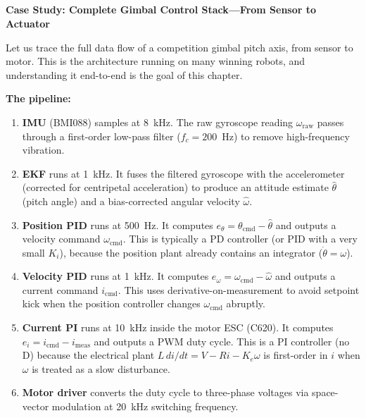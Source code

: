 \subsection*{}

\vspace{0.5em}
\begin{mdframed}[linewidth=1pt, innertopmargin=10pt, innerbottommargin=10pt]
\textbf{Case Study: Complete Gimbal Control Stack---From Sensor to Actuator}

\vspace{0.3em}
Let us trace the full data flow of a competition gimbal pitch axis, from sensor to motor. This is the architecture running on many winning robots, and understanding it end-to-end is the goal of this chapter.

\textbf{The pipeline:}

\begin{enumerate}[nosep]
    \item \textbf{IMU} (BMI088) samples at 8~kHz. The raw gyroscope reading $\omega_{\text{raw}}$ passes through a first-order low-pass filter ($f_c = 200$~Hz) to remove high-frequency vibration.
    \item \textbf{EKF} runs at 1~kHz. It fuses the filtered gyroscope with the accelerometer (corrected for centripetal acceleration) to produce an attitude estimate $\hat{\theta}$ (pitch angle) and a bias-corrected angular velocity $\hat{\omega}$.
    \item \textbf{Position PID} runs at 500~Hz. It computes $e_\theta = \theta_{\text{cmd}} - \hat{\theta}$ and outputs a velocity command $\omega_{\text{cmd}}$. This is typically a PD controller (or PID with a very small $K_i$), because the position plant already contains an integrator ($\dot{\theta} = \omega$).
    \item \textbf{Velocity PID} runs at 1~kHz. It computes $e_\omega = \omega_{\text{cmd}} - \hat{\omega}$ and outputs a current command $i_{\text{cmd}}$. This uses derivative-on-measurement to avoid setpoint kick when the position controller changes $\omega_{\text{cmd}}$ abruptly.
    \item \textbf{Current PI} runs at 10~kHz inside the motor ESC (C620). It computes $e_i = i_{\text{cmd}} - i_{\text{meas}}$ and outputs a PWM duty cycle. This is a PI controller (no D) because the electrical plant $L\,di/dt = V - Ri - K_e\omega$ is first-order in $i$ when $\omega$ is treated as a slow disturbance.
    \item \textbf{Motor driver} converts the duty cycle to three-phase voltages via space-vector modulation at 20~kHz switching frequency.
\end{enumerate}


\end{mdframed}
